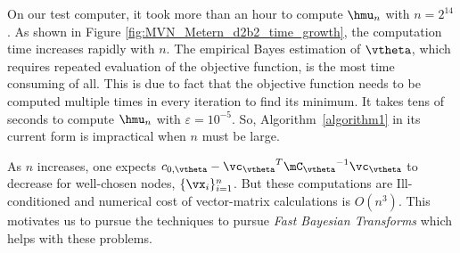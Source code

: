 On our test computer, it took more than an hour to compute $\hmu_n$ with $n=2^{14}$. 
As shown in Figure \ref{fig:MVN_Metern_d2b2_time_growth}, the computation time increases rapidly with $n$. 
The empirical Bayes estimation of $\vtheta$, which requires repeated evaluation of the objective function, is the most time consuming of all. This is due to fact that the objective function needs to be computed multiple times in every iteration to find its minimum. It takes tens of seconds to compute $\hmu_n$ with $\varepsilon = 10^{-5}$.   
So, Algorithm~\ref{algorithm1} in its current form is impractical when $n$ must be large.


As $n$ increases, one expects $c_{0,\vtheta} - {\vc_\vtheta}^T{\mC_\vtheta}^{-1}{\vc_\vtheta}$ to decrease for well-chosen nodes, $\{\vx_i\}_{i=1}^n$. 
But these computations are Ill-conditioned and numerical cost of vector-matrix calculations is $O (n^3)$. This motivates us to pursue the techniques to pursue \emph{Fast Bayesian Transforms} which helps with these problems.








